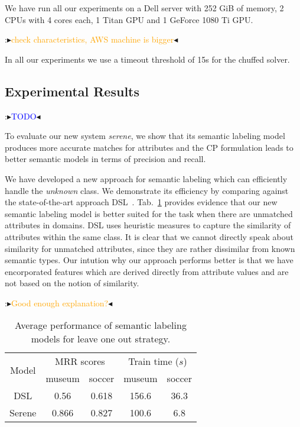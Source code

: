 \documentclass[letterpaper]{article} %
\newcommand{\authornote}[3]{
  {\fbox{\sc 
  #1}:$\blacktriangleright$\textcolor{#2}{\small{#3}}$\blacktriangleleft$}%
}
\newcommand{\ddg}[1]{\authornote{DDG}{blue}{#1}}
\newcommand{\npr}[1]{\authornote{NPR}{orange}{#1}}
\begin{document}
We have run all our experiments on a Dell server with 252 GiB of memory, 2 CPUs with 4 cores each, 1 Titan GPU and 1 GeForce 1080 Ti GPU.
\npr{check characteristics, AWS machine is bigger}
In all our experiments we use a timeout threshold of 15s for the chuffed solver.

\subsection{Experimental Results}
\ddg{TODO}

To evaluate our new system \emph{serene}, we show that its semantic labeling model produces more accurate matches for attributes and the CP formulation leads to better semantic models in terms of precision and recall.

We have developed a new approach for semantic labeling which can efficiently handle the \emph{unknown} class.
We demonstrate its efficiency by comparing against the state-of-the-art approach DSL~\cite{Pham:semantic}.
Tab.~\ref{tab:semlab} provides evidence that our new semantic labeling model is better suited for the task when there are unmatched attributes in domains.
DSL uses heuristic measures to capture the similarity of attributes within the same class.
It is clear that we cannot directly speak about similarity for unmatched attributes, since they are rather dissimilar from known semantic types.
Our intution why our approach performs better is that we have encorporated features which are derived directly from attribute values and are not based on the notion of similarity.
\npr{Good enough explanation?}

\begin{table}[t]\small
  \centering
  \caption{Average performance of semantic labeling models for leave one out strategy.}
  	\label{tab:semlab}
  	\begin{tabular}{c|cc|cc} 
  		\hline
  		\multirow{2}{*}{Model} & \multicolumn{2}{c|}{MRR scores} & \multicolumn{2}{c}{Train time ($s$)}\\
  		 & museum & soccer & museum & soccer\\
  		\hline
  		DSL & 0.56 & 0.618 & 156.6 & 36.3\\
 		Serene & 0.866 & 0.827 & 100.6 & 6.8\\
  		\hline
		\end{tabular} 
\end{table}
\end{document}
